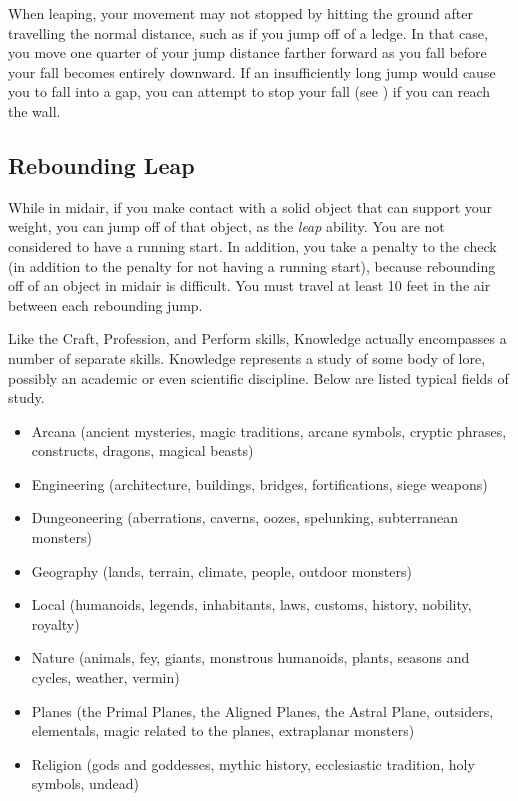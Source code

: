         When leaping, your movement may not stopped by hitting the ground after travelling the normal distance, such as if you jump off of a ledge.
        In that case, you move one quarter of your jump distance farther forward as you fall before your fall becomes entirely downward.
        If an insufficiently long jump would cause you to fall into a gap, you can attempt to stop your fall (see ) if you can reach the wall.

    \subsection{Rebounding Leap}\label{Rebounding Leap}
        While in midair, if you make contact with a solid object that can support your weight, you can jump off of that object, as the \textit{leap} ability.
        You are not considered to have a running start.
        In addition, you take a  penalty to the check (in addition to the penalty for not having a running start), because rebounding off of an object in midair is difficult.
        You must travel at least 10 feet in the air between each rebounding jump.

\newpage
{}
        Like the Craft, Profession, and Perform skills, Knowledge actually encompasses a number of separate skills. Knowledge represents a study of some body of lore, possibly an academic or even scientific discipline. Below are listed typical fields of study.
        \begin{itemize}
            \item Arcana (ancient mysteries, magic traditions, arcane symbols,
                cryptic phrases, constructs, dragons, magical beasts)
            \item Engineering (architecture, buildings, bridges, fortifications, siege weapons)
            \item Dungeoneering (aberrations, caverns, oozes, spelunking, subterranean monsters)
            \item Geography (lands, terrain, climate, people, outdoor monsters)
            \item Local (humanoids, legends, inhabitants, laws, customs, history, nobility, royalty)
            \item Nature (animals, fey, giants, monstrous humanoids, plants, seasons and cycles, weather, vermin)
            \item Planes (the Primal Planes, the Aligned Planes, the Astral Plane,
                outsiders, elementals, magic related to the planes, extraplanar monsters)
            \item Religion (gods and goddesses, mythic history, ecclesiastic tradition, holy symbols, undead)
        \end{itemize}

